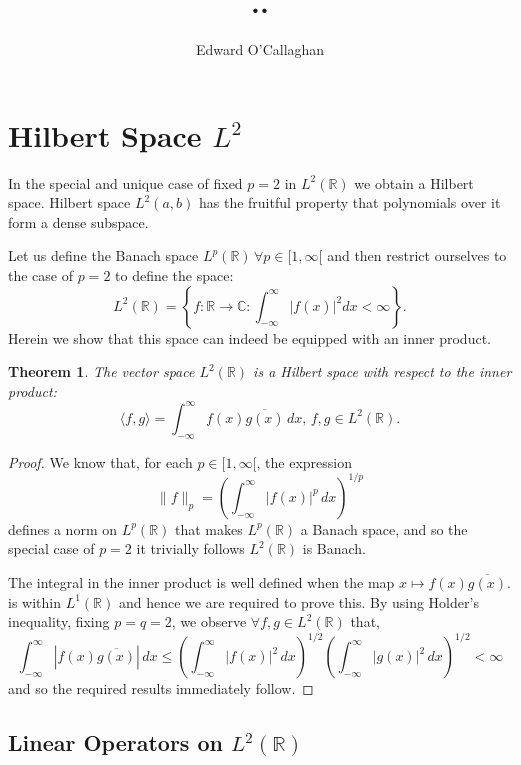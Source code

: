 \documentclass{article}
\title{..}
\author{Edward O'Callaghan}
\newtheorem{thm}{Theorem}[section]
\begin{document}
\maketitle

\section{Hilbert Space $L^2$}

In the special and unique case of fixed $p=2$ in $L^2(\mathbb{R})$ we obtain a Hilbert
space. Hilbert space $L^2(a,b)$ has the fruitful property that polynomials over
it form a dense subspace.

Let us define the Banach space $L^p(\mathbb{R})\, \forall p \in [1, \infty[$ and then
restrict ourselves to the case of $p=2$ to define the space:
\[
 L^2(\mathbb{R}) = \left\{ f : \mathbb{R} \rightarrow \mathbb{C} : \int_{-\infty}^{\infty} \left| f(x) \right|^2 dx < \infty \right\}.
\]
Herein we show that this space can indeed be equipped with an inner product.

\begin{thm}
The vector space $L^2(\mathbb{R})$ is a Hilbert space with respect to the inner product:
  \[
    \langle f,g \rangle = \int_{-\infty}^{\infty} f(x) \overline{g(x)} \, dx, \, f,g \in L^2(\mathbb{R}).
  \]
\end{thm}

\begin{proof}
We know that, for each $p\in[1,\infty[$, the expression
  \[
    \|f\|_p = \left( \int_{-\infty}^{\infty} |f(x)|^p \, dx \right)^{1/p}
  \]
defines a norm on $L^p(\mathbb{R})$ that makes $L^p(\mathbb{R})$ a Banach
space, and so the special case of $p=2$ it trivially follows $L^2(\mathbb{R})$
is Banach.

The integral in the inner product is well defined when the map $x \mapsto f(x)
\overline{g(x)}$. is within $L^1(\mathbb{R})$ and hence we are required to prove
this. By using Holder's inequality, fixing $p=q=2$, we observe $\forall f,g \in
L^2(\mathbb{R})$ that,
\[
  \int_{-\infty}^{\infty} |f(x) \overline{g(x)}| \, dx \leq
  \left( \int_{-\infty}^{\infty} |f(x)|^2 \, dx \right)^{1/2}
  \left( \int_{-\infty}^{\infty} |g(x)|^2 \, dx \right)^{1/2} < \infty
\]
and so the required results immediately follow.
\end{proof}

\subsection{Linear Operators on $L^2(\mathbb{R})$}
\end{document}
